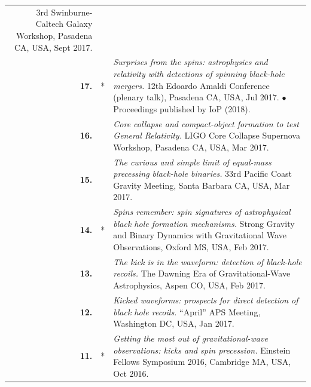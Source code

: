 {\begin{longtable}{rp{0.3cm}p{15.8cm}}
\newline{}
3rd Swinburne-Caltech Galaxy Workshop, Pasadena CA, USA, Sept 2017.
\vspace{0.05cm}\\
%
\textbf{17.} & * & \textit{Surprises from the spins: astrophysics and relativity with detections of spinning black-hole mergers.}
\newline{}
12th Edoardo Amaldi Conference (plenary talk), Pasadena CA, USA, Jul 2017.
\newline{}
\textcolor{color1}{$\bullet$} Proceedings published by IoP (2018).
\vspace{0.05cm}\\
%
\textbf{16.} &  & \textit{Core collapse and compact-object formation to test General Relativity.}
\newline{}
LIGO Core Collapse Supernova Workshop, Pasadena CA, USA, Mar 2017.
\vspace{0.05cm}\\
%
\textbf{15.} &  & \textit{The curious and simple limit of equal-mass precessing black-hole binaries.}
\newline{}
33rd Pacific Coast Gravity Meeting, Santa Barbara CA, USA, Mar 2017.
\vspace{0.05cm}\\
%
\textbf{14.} & * & \textit{Spins remember: spin signatures of astrophysical black hole formation mechanisms.}
\newline{}
Strong Gravity and Binary Dynamics with Gravitational Wave Observations, Oxford MS, USA, Feb 2017.
\vspace{0.05cm}\\
%
\textbf{13.} &  & \textit{The kick is in the waveform: detection of black-hole recoils.}
\newline{}
The Dawning Era of Gravitational-Wave Astrophysics, Aspen CO, USA, Feb 2017.
\vspace{0.05cm}\\
%
\textbf{12.} &  & \textit{Kicked waveforms: prospects for direct detection of black hole recoils.}
\newline{}
``April'' APS Meeting, Washington DC, USA, Jan 2017.
\vspace{0.05cm}\\
%
\textbf{11.} & * & \textit{Getting the most out of gravitational-wave observations: kicks and spin precession.}
\newline{}
Einstein Fellows Symposium 2016, Cambridge MA, USA, Oct 2016.
\vspace{0.05cm}\\

\end{longtable}}
